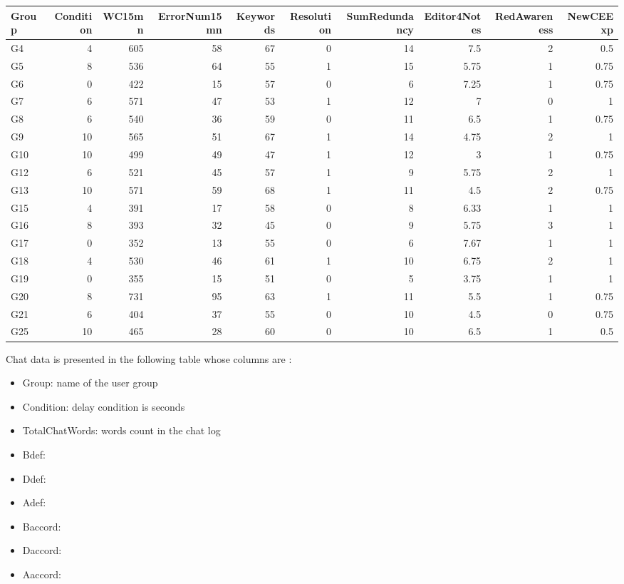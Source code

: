 \documentclass[10pt]{article}
\begin{document}
{\scriptsize
\begin{center}
\begin{tabular}{lrrrrrrrrr}
Group & Condition & WC15mn & ErrorNum15mn & Keywords & Resolution & SumRedundancy & Editor4Notes & RedAwareness & NewCEExp\\
\hline
G4 & 4 & 605 & 58 & 67 & 0 & 14 & 7.5 & 2 & 0.5\\
G5 & 8 & 536 & 64 & 55 & 1 & 15 & 5.75 & 1 & 0.75\\
G6 & 0 & 422 & 15 & 57 & 0 & 6 & 7.25 & 1 & 0.75\\
G7 & 6 & 571 & 47 & 53 & 1 & 12 & 7 & 0 & 1\\
G8 & 6 & 540 & 36 & 59 & 0 & 11 & 6.5 & 1 & 0.75\\
G9 & 10 & 565 & 51 & 67 & 1 & 14 & 4.75 & 2 & 1\\
G10 & 10 & 499 & 49 & 47 & 1 & 12 & 3 & 1 & 0.75\\
G12 & 6 & 521 & 45 & 57 & 1 & 9 & 5.75 & 2 & 1\\
G13 & 10 & 571 & 59 & 68 & 1 & 11 & 4.5 & 2 & 0.75\\
G15 & 4 & 391 & 17 & 58 & 0 & 8 & 6.33 & 1 & 1\\
G16 & 8 & 393 & 32 & 45 & 0 & 9 & 5.75 & 3 & 1\\
G17 & 0 & 352 & 13 & 55 & 0 & 6 & 7.67 & 1 & 1\\
G18 & 4 & 530 & 46 & 61 & 1 & 10 & 6.75 & 2 & 1\\
G19 & 0 & 355 & 15 & 51 & 0 & 5 & 3.75 & 1 & 1\\
G20 & 8 & 731 & 95 & 63 & 1 & 11 & 5.5 & 1 & 0.75\\
G21 & 6 & 404 & 37 & 55 & 0 & 10 & 4.5 & 0 & 0.75\\
G25 & 10 & 465 & 28 & 60 & 0 & 10 & 6.5 & 1 & 0.5\\
\end{tabular}
\end{center}
}


Chat data is presented in the following table whose columns are :
\begin{itemize}
\item Group: name of the user group
\item Condition: delay condition is seconds
\item TotalChatWords: words count in the chat log
\item Bdef:
\item Ddef:
\item Adef:
\item Baccord:
\item Daccord:
\item Aaccord:
\end{itemize}
\end{document}

